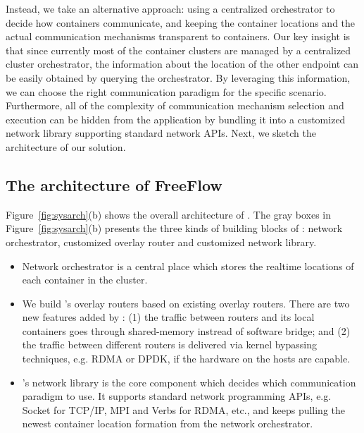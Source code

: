 Instead, we take an alternative approach: using a centralized orchestrator to decide how containers communicate, and keeping the container locations and the actual
communication mechanisms transparent to containers. 
Our key insight is that since currently most of the container clusters are managed by a centralized cluster orchestrator, the information about the location of the other endpoint
can be easily obtained by querying the orchestrator. By leveraging this
information, we can choose the right communication paradigm for the specific
scenario. Furthermore, all of the complexity of communication mechanism selection
and execution can be hidden from the application
by bundling it into a customized network library supporting standard 
network APIs.
Next, we sketch the architecture of our solution.

\subsection{The architecture of FreeFlow}


Figure~\ref{fig:sysarch}(b) shows the overall architecture of \sysname.
The gray boxes in Figure~\ref{fig:sysarch}(b) presents the three kinds of
building blocks of \sysname: network orchestrator, customized overlay router and
customized network library.
\begin{itemize}

\item Network orchestrator is a central place which stores the realtime locations
of each container in the cluster. 

\item We build \sysname's overlay routers based
on existing overlay routers. There are two new features added by \sysname:
(1) the traffic between routers and its local containers goes through shared-memory instread of software bridge; and (2) the traffic between different
routers is delivered via kernel bypassing techniques, e.g. RDMA or DPDK, if
the hardware on the hosts are capable.

\item \sysname's network library is the core component which decides which
communication paradigm to use. It supports standard network programming APIs,
e.g. Socket for TCP/IP, MPI and Verbs for RDMA, etc., and keeps pulling
the newest container location formation from the network orchestrator. 


\end{itemize} 

